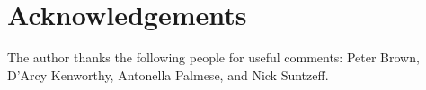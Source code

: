 \section*{Acknowledgements}
The author thanks the following people for useful comments: Peter Brown, D'Arcy Kenworthy, Antonella Palmese, and Nick Suntzeff.
{}
% 

